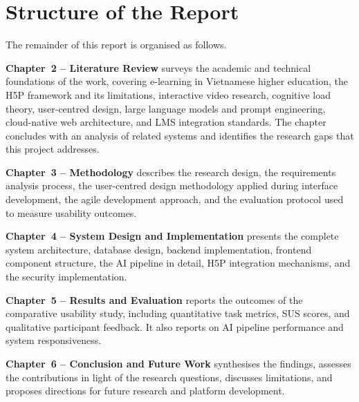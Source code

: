 \section{Structure of the Report}

The remainder of this report is organised as follows.

\textbf{Chapter~2 -- Literature Review} surveys the academic and technical
foundations of the work, covering e-learning in Vietnamese higher education,
the H5P framework and its limitations, interactive video research, cognitive
load theory, user-centred design, large language models and prompt
engineering, cloud-native web architecture, and LMS integration standards.
The chapter concludes with an analysis of related systems and identifies the
research gaps that this project addresses.

\textbf{Chapter~3 -- Methodology} describes the research design, the
requirements analysis process, the user-centred design methodology applied
during interface development, the agile development approach, and the
evaluation protocol used to measure usability outcomes.

\textbf{Chapter~4 -- System Design and Implementation} presents the
complete system architecture, database design, backend implementation,
frontend component structure, the AI pipeline in detail, H5P integration
mechanisms, and the security implementation.

\textbf{Chapter~5 -- Results and Evaluation} reports the outcomes of
the comparative usability study, including quantitative task metrics,
SUS scores, and qualitative participant feedback. It also reports on
AI pipeline performance and system responsiveness.

\textbf{Chapter~6 -- Conclusion and Future Work} synthesises the findings,
assesses the contributions in light of the research questions, discusses
limitations, and proposes directions for future research and platform
development.

